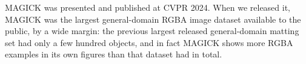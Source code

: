 MAGICK was presented and published at CVPR 2024. When we released it, MAGICK was the largest general-domain RGBA image dataset available to the public, by a wide margin: the previous largest released general-domain matting set had only a few hundred objects, and in fact MAGICK shows more RGBA examples in its own figures than that dataset had in total. 
